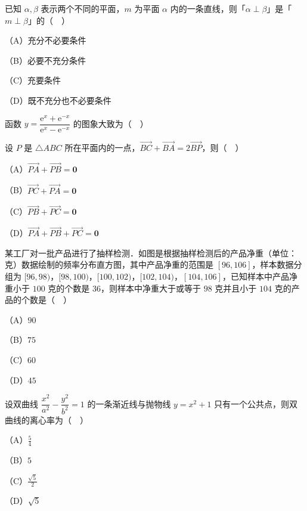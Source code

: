 \begin{question}
已知 $\alpha,\beta$ 表示两个不同的平面，$m$ 为平面 $\alpha$ 内的一条直线，则「$\alpha\perp\beta$」是「$m\perp\beta$」的（　）

（A）充分不必要条件

（B）必要不充分条件

（C）充要条件

（D）既不充分也不必要条件

\Needspace{0.4\textheight}
\end{question}
\begin{question}
函数 $y=\dfrac{\mathrm e^x+\mathrm e^{-x}}{\mathrm e^x-\mathrm e^{-x}}$ 的图象大致为（　）
\nopagebreak[4]
\begin{center}\end{center}
\nopagebreak[4]
\end{question}
\begin{question}
设 $P$ 是 $\triangle ABC$ 所在平面内的一点，$\overrightarrow{BC}+\overrightarrow{BA}=2\overrightarrow{BP}$，则（　）

（A）$\overrightarrow{PA}+\overrightarrow{PB}=\mathbf 0$

（B）$\overrightarrow{PC}+\overrightarrow{PA}=\mathbf 0$

（C）$\overrightarrow{PB}+\overrightarrow{PC}=\mathbf 0$

（D）$\overrightarrow{PA}+\overrightarrow{PB}+\overrightarrow{PC}=\mathbf 0$

\Needspace{0.4\textheight}
\end{question}
\begin{question}
某工厂对一批产品进行了抽样检测．如图是根据抽样检测后的产品净重（单位：克）数据绘制的频率分布直方图，其中产品净重的范围是 $[96,106]$，样本数据分组为 $[96,98)$，$[98,100)$，$[100,102)$，$[102,104)$，$[104,106]$，已知样本中产品净重小于 $100$ 克的个数是 $36$，则样本中净重大于或等于 $98$ 克并且小于 $104$ 克的产品的个数是（　）

（A）$90$

（B）$75$

（C）$60$

（D）$45$
\nopagebreak[4]
\begin{center}\end{center}
\nopagebreak[4]
\end{question}
\begin{question}
设双曲线 $\dfrac{x^2}{a^2}-\dfrac{y^2}{b^2}=1$ 的一条渐近线与抛物线 $y=x^2+1$ 只有一个公共点，则双曲线的离心率为（　）

（A）$\frac54$

（B）$5$

（C）$\frac{\sqrt5}{2}$

（D）$\sqrt5$

\end{question}
